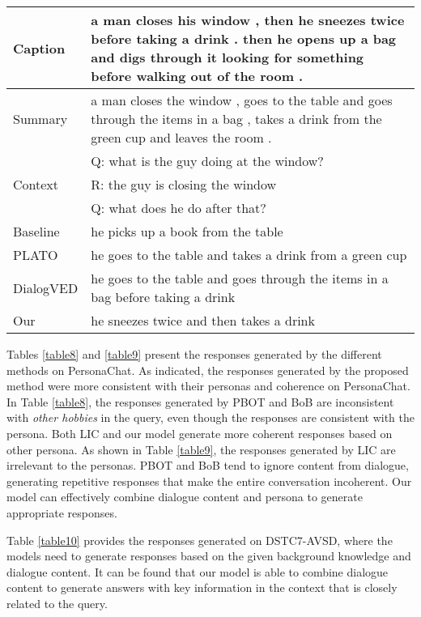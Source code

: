 \documentclass[letterpaper]{article} \usepackage{aaai23}  \usepackage{times}  \usepackage{helvet}  \usepackage{courier}  \usepackage[hyphens]{url}  \usepackage{graphicx} \urlstyle{rm} \def\UrlFont{\rm}  \usepackage{natbib}  \usepackage{caption} \frenchspacing  \setlength{\pdfpagewidth}{8.5in}  \setlength{\pdfpageheight}{11in}  \usepackage{algorithm}
\begin{document}
\begin{table*}[ht]
  \centering
    \begin{tabular}{lp{30em}}
    \toprule
    Caption & a man closes his window , then he sneezes twice before taking a drink . then he opens up a bag and digs through it looking for something before walking out of the room . \\
    \midrule
    Summary & a man closes the window , goes to the table and goes through the items in a bag , takes a drink from the green cup and leaves the room . \\
    \midrule
    \multirow{3}[6]{*}{Context} & Q: what is the guy doing at the window? \\
\cmidrule{2-2}     & R: the guy is closing the window \\
\cmidrule{2-2}     & Q: what does he do after that? \\
\bottomrule
    \toprule
    Baseline & he picks up a book from the table \\
    \midrule
    PLATO & he goes to the table and takes a drink from a green cup \\
    \midrule
    DialogVED & he goes to the table and goes through the items in a bag before taking a drink \\
    \midrule
    Our   & he sneezes twice and then takes a drink \\
    \bottomrule
    \end{tabular}\caption{Case analysis of response generation on the DSTC7-AVSD.}
\label{table10}\end{table*}Tables \ref{table8} and \ref{table9} present the responses generated by the different methods on PersonaChat. As indicated, the responses generated by the proposed method were more consistent with their personas and coherence on PersonaChat. In Table \ref{table8}, the responses generated by PBOT and BoB are inconsistent with \textit{other hobbies} in the query, even though the responses are consistent with the persona. Both LIC and our model generate more coherent responses based on other persona. As shown in Table \ref{table9}, the responses generated by LIC are irrelevant to the personas. PBOT and BoB tend to ignore content from dialogue, generating repetitive responses that make the entire conversation incoherent. Our model can effectively combine dialogue content and persona to generate appropriate responses.

Table \ref{table10} provides the responses generated on DSTC7-AVSD, where the models need to generate responses based on the given background knowledge and dialogue content. It can be found that our model is able to combine dialogue content to generate answers with key information in the context that is closely related to the query.
\end{document}
